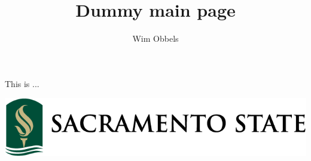 \documentclass{ximera}
\begin{document}
	\author{Wim Obbels}
	\title{Dummy main page}
    \begin{abstract}\end{abstract}

	\maketitle


	This is ...

	\includegraphics{logo}
\end{document}
